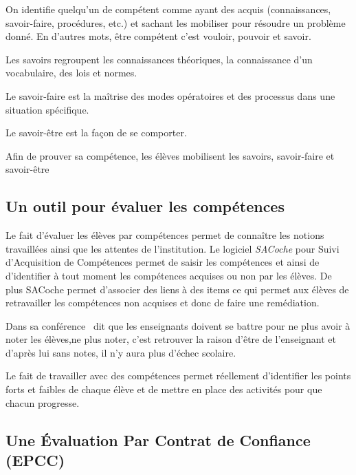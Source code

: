 On identifie quelqu'un de compétent comme ayant des acquis (connaissances, savoir-faire, procédures, etc.) et sachant les mobiliser pour résoudre un problème donné.
En d'autres mots, être compétent c'est vouloir, pouvoir et savoir.

Les savoirs regroupent les connaissances théoriques, la connaissance d'un vocabulaire, des lois et normes.

Le savoir-faire est la maîtrise des modes opératoires et des processus dans une situation spécifique.

Le savoir-être est la façon de se comporter.

Afin de prouver sa compétence, les élèves mobilisent les savoirs, savoir-faire et savoir-être

\subsection{Un outil pour évaluer les compétences}

Le fait d'évaluer les élèves par compétences permet de connaître les notions travaillées ainsi que les attentes de l'institution.
Le logiciel \textit{SACoche} pour Suivi d'Acquisition de Compétences permet de saisir les compétences et ainsi de d'identifier à tout moment les compétences acquises ou non par les élèves.
De plus SACoche permet d'associer des liens à des items ce qui permet aux élèves de retravailler les compétences non acquises et donc de faire une remédiation.

Dans sa conférence~\cite{principiano} dit que les enseignants doivent se battre pour ne plus avoir à noter les élèves,ne plus noter, c'est retrouver la raison d'être de l'enseignant et d'après lui sans notes, il n'y aura plus d'échec scolaire.

Le fait de travailler avec des compétences permet réellement d'identifier les points forts et faibles de chaque élève et de mettre en place des activités pour que chacun progresse.

\subsection{Une Évaluation Par Contrat de Confiance (EPCC)}

